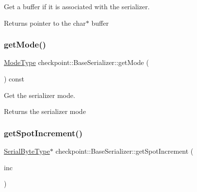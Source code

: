 Get a buffer if it is associated with the serializer. 

\begin{DoxyReturn}{Returns}
pointer to the {\ttfamily char$\ast$} buffer 
\end{DoxyReturn}
\mbox{\label{structcheckpoint_1_1_base_serializer_ad9a3bf9aa8081b6efdf8a45ba92ef641}} 
\subsubsection{\texorpdfstring{get\+Mode()}{getMode()}}
{\footnotesize\ttfamily \hyperlink{namespacecheckpoint_ae2509499ccd8b1dc48fb535bf8aa3059}{Mode\+Type} checkpoint\+::\+Base\+Serializer\+::get\+Mode (\begin{DoxyParamCaption}{ }\end{DoxyParamCaption}) const\hspace{0.3cm}{\ttfamily [inline]}}



Get the serializer mode. 

\begin{DoxyReturn}{Returns}
the serializer mode 
\end{DoxyReturn}
\mbox{\label{structcheckpoint_1_1_base_serializer_a2b6d088bf58d9c77f12a959763bb307b}} 
\subsubsection{\texorpdfstring{get\+Spot\+Increment()}{getSpotIncrement()}}
{\footnotesize\ttfamily \hyperlink{namespacecheckpoint_ae57f01cdc0b81776c23b6c7c934c58f5}{Serial\+Byte\+Type}$\ast$ checkpoint\+::\+Base\+Serializer\+::get\+Spot\+Increment (\begin{DoxyParamCaption}\item[{\hyperlink{namespacecheckpoint_a083f6674da3f94c2901b18c6d238217c}{Serial\+Size\+Type} const}]{inc }\end{DoxyParamCaption})\hspace{0.3cm}{\ttfamily [inline]}}



